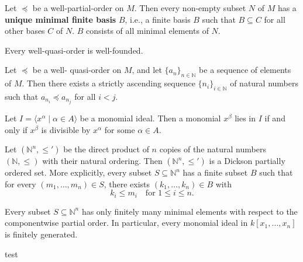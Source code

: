 \begin{corollary}\label{cor:MinimalFiniteBasis}
    Let $\preceq$ be a well-partial-order on $M$.
    Then every non-empty subset $N$ of $M$ has a \textup{\textbf{unique minimal finite basis}} $B$, i.e., a finite basis $B$ such that $B \subseteq C$ for all other bases $C$ of $N$. 
    $B$ consists of all minimal elements of $N$.
\end{corollary}
    
\begin{corollary}\label{cor:wqo_is_wellFounded}
    Every well-quasi-order is well-founded.
\end{corollary}
    
\begin{proposition}\label{prop:wqoAscendingSubsequence}
    Let $\preceq$ be a well- quasi-order on $M$, and let $\{a_n\}_{n \in \mathbb{N}}$ be a sequence of elements of $M$.
    Then there exists a strictly ascending sequence $\{n_i\}_{i \in \mathbb{N}}$ of natural numbers such that $a_{n_i} \preceq a_{n_j}$ for all $i < j$.
\end{proposition}

\begin{lemma}\label{lem:monomial_ideal}
    Let $I = \langle x^\alpha \mid \alpha \in A \rangle$ be a monomial ideal.
    Then a monomial $x^\beta$ lies in $I$ if and only if $x^\beta$ is divisible by $x^\alpha$ for some $\alpha \in A$.
\end{lemma}

\begin{theorem}\label{thm:Dickson} %
    Let $(\mathbb{N}^n, \le')$ be the direct product of $n$ copies of the natural numbers $(\mathbb{N}, \le)$ with their natural ordering. 
    Then $(\mathbb{N}^n, \le')$ is a Dickson partially ordered set. 
    More explicitly, every subset $S \subseteq \mathbb{N}^n$ has a finite subset $B$ such that for every $(m_1, \dots, m_n) \in S$, there exists $(k_1, \dots, k_n) \in B$ with
    \[
    k_i \le m_i \quad \text{for } 1 \le i \le n.
    \]
\end{theorem}

\begin{theorem}\label{thm:Dickson'}
    Every subset $S\subseteq \mathbb{N}^n$ has only finitely many minimal elements with respect to the componentwise partial order. 
    In particular, every monomial ideal in $k[x_1,\dots,x_n]$ is finitely generated.
\end{theorem}

\begin{theorem}
    test
\end{theorem}